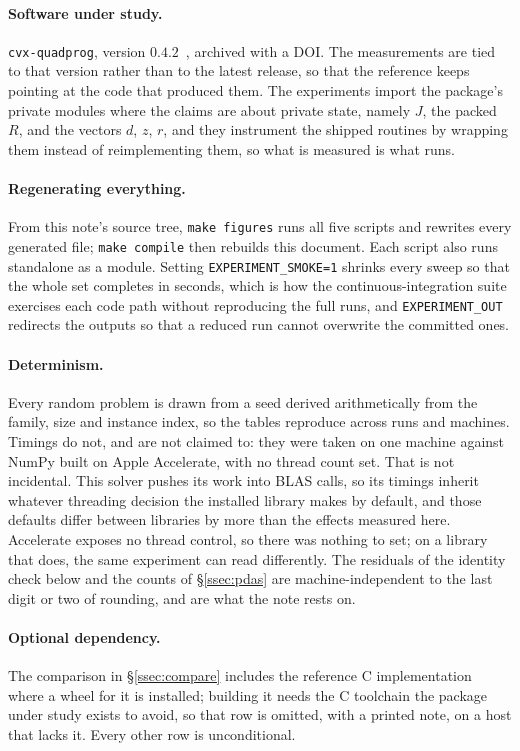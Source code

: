 \paragraph{Software under study.} \texttt{cvx-quadprog}, version
$0.4.2$~\cite{cvxquadprog}, archived with a DOI. The measurements are tied to that
version rather than to the latest release, so that the reference keeps pointing at
the code that produced them. The experiments import the package's private modules
where the claims are about private state, namely $J$, the packed $R$, and the
vectors $d$, $z$, $r$, and they instrument the shipped routines by wrapping them
instead of reimplementing them, so what is measured is what runs.

\paragraph{Regenerating everything.} From this note's source tree, \verb|make figures|
runs all five scripts and rewrites every generated file; \verb|make compile| then
rebuilds this document. Each script also runs standalone as a module. Setting
\verb|EXPERIMENT_SMOKE=1| shrinks every sweep so that the whole set completes in
seconds, which is how the continuous-integration suite exercises each code path
without reproducing the full runs, and \verb|EXPERIMENT_OUT| redirects the outputs
so that a reduced run cannot overwrite the committed ones.

\paragraph{Determinism.} Every random problem is drawn from a seed derived
arithmetically from the family, size and instance index, so the tables reproduce
across runs and machines. Timings do not, and are not claimed to: they were taken
on one machine against NumPy built on Apple Accelerate, with no thread count set.
That is not incidental. This solver pushes its work into BLAS calls, so its
timings inherit whatever threading decision the installed library makes by default,
and those defaults differ between libraries by more than the effects measured here.
Accelerate exposes no thread control, so there was nothing to set; on a library
that does, the same experiment can read differently. The residuals of
the identity check below and the counts of \S\ref{ssec:pdas} are machine-independent
to the last digit or two of rounding, and are what the note rests on.

\paragraph{Optional dependency.} The comparison in \S\ref{ssec:compare} includes
the reference C implementation where a wheel for it is installed; building it needs
the C toolchain the package under study exists to avoid, so that row is omitted,
with a printed note, on a host that lacks it. Every other row is unconditional.
